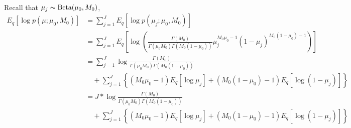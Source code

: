 \documentclass[11pt,reqno]{amsart}
\begin{document}
\begin{equation}
\begin{split}
%
\end{split}
\end{equation}

Recall that $\mu_j \thicksim \text{Beta}(\mu_0, M_0)$,
\begin{equation}
\begin{split}
\label{mu}
E_q \left[ \log p\left(\mu ; \mu_0, M_0 \right)\right] &= \sum_{j=1}^{J} E_q  \left[ \log p\left( \mu_j; \mu_0, M_0 \right) \right] \\
&= \sum_{j=1}^{J} E_q  \left[ \log \left( \frac{ \Gamma(M_0) } { \Gamma(\mu_0 M_0) \Gamma(M_0 (1-\mu_0)) } \mu_j^{M_0\mu_0 -1} (1 - \mu_j)^{M_0 ( 1 - \mu_0) - 1} \right) \right] \\
&= \sum_{j=1}^{J} \log \frac{ \Gamma(M_0) } { \Gamma(\mu_0 M_0) \Gamma(M_0 (1-\mu_0))} \\
&\quad + \sum_{j=1}^{J} \left\lbrace (M_0\mu_0 -1)E_q  \left[ \log \mu_j \right] + (M_0 ( 1 - \mu_0) - 1) E_q  \left[ \log (1 - \mu_j)\right]\right\rbrace  \\
&= J* \log \frac{ \Gamma(M_0) } { \Gamma(\mu_0 M_0) \Gamma(M_0 (1-\mu_0))} \\
&\quad + \sum_{j=1}^{J} \left\lbrace (M_0\mu_0 -1)E_q  \left[ \log \mu_j \right] + (M_0 ( 1 - \mu_0) - 1) E_q  \left[ \log (1 - \mu_j)\right]\right\rbrace  \\
%
%
\end{split}
\end{equation}
\end{document}
